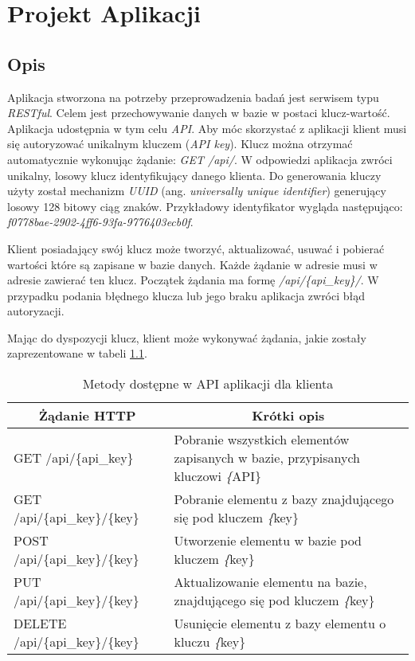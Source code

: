 \chapter{Projekt Aplikacji}
\section{Opis}
Aplikacja stworzona na potrzeby przeprowadzenia badań jest serwisem typu \textsl{RESTful}. Celem jest przechowywanie danych w bazie w postaci klucz-wartość.  Aplikacja udostępnia w tym celu \textsl{API}. Aby móc skorzystać z aplikacji klient musi się autoryzować unikalnym kluczem (\textsl{API key}). Klucz można otrzymać automatycznie wykonując żądanie: \textsl{GET /api/}. W odpowiedzi aplikacja zwróci unikalny, losowy klucz identyfikujący danego klienta. Do generowania kluczy użyty został mechanizm \textsl{UUID} (ang. \textsl{universally unique identifier}) generujący losowy 128 bitowy ciąg znaków. Przykładowy identyfikator wygląda następująco: \textsl{f0778bae-2902-4ff6-93fa-9776403ecb0f}.

Klient posiadający swój klucz może tworzyć, aktualizować, usuwać i pobierać wartości które są zapisane w bazie danych. Każde żądanie w adresie musi w adresie zawierać ten klucz. Początek żądania ma formę \textsl{/api/\{api\_key\}/}. W przypadku podania błędnego klucza lub jego braku aplikacja zwróci błąd autoryzacji. 

Mając do dyspozycji klucz, klient może wykonywać żądania, jakie zostały zaprezentowane w tabeli \ref{tab:restcache-api}.
\begin{table}[!htb]
\centering
\caption{Metody dostępne w API aplikacji dla klienta}
\label{tab:restcache-api}
\begin{tabularx}{\textwidth}{@{} X X @{}}
\toprule
\multicolumn{1}{c}{\textbf{Żądanie HTTP}}            & \multicolumn{1}{c}{\textbf{Krótki opis}}                                               \\ \midrule
GET /api/\{api\_key\}                                & Pobranie wszystkich elementów zapisanych w bazie, przypisanych kluczowi \textsl\{API\} \\
GET /api/\{api\_key\}/\{key\}                        & Pobranie elementu z bazy znajdującego się pod kluczem \textsl\{key\}                   \\
POST /api/\{api\_key\}/\{key\}                       & Utworzenie elementu w bazie pod kluczem \textsl\{key\}                                 \\
PUT /api/\{api\_key\}/\{key\}                        & Aktualizowanie elementu na bazie, znajdującego się pod kluczem \textsl\{key\}        \\
DELETE /api/\{api\_key\}/\{key\} & Usunięcie elementu z bazy elementu o kluczu \textsl\{key\}                            
\end{tabularx}
\end{table}



